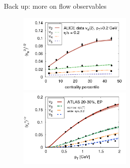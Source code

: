 \documentclass[11pt]{beamer}
\begin{document}
\begin{frame}[noframenumbering]{Back up: more on flow observables}

 	\begin{center}
    \begin{figure}
   	\includegraphics[width=0.5\textwidth]{pics/Gale-1.png}
   	\includegraphics[width=0.5\textwidth]{pics/Gale-2.png}
  	\end{figure}
  	\end{center} 

\end{frame}
\end{document}
